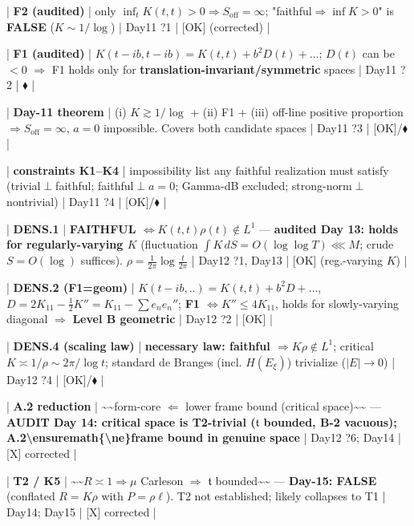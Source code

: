 \documentclass[10pt]{article}
\begin{document}
| \textbf{F2 (audited)} | only $\inf_t K(t,t)>0\Rightarrow S_{\mathrm{off}}=\infty$; "faithful$\Rightarrow\inf K>0$" is \textbf{FALSE} ($K\sim1/\log$) | Day11 ?1 | [OK] (corrected) |\par
| \textbf{F1 (audited)} | $K(t-ib,t-ib)=K(t,t)+b^2D(t)+\dots$; $D(t)$ can be $<0$ \ensuremath{\Rightarrow} F1 holds only for \textbf{translation-invariant/symmetric} spaces | Day11 ?2 | $\blacklozenge$ |\par
| \textbf{Day-11 theorem} | (i) $K\gtrsim1/\log$ + (ii) F1 + (iii) off-line positive proportion $\Rightarrow S_{\mathrm{off}}=\infty$, $a=0$ impossible. Covers both candidate spaces | Day11 ?3 | [OK]/$\blacklozenge$ |\par
| \textbf{constraints K1--K4} | impossibility list any faithful realization must satisfy (trivial$\perp$faithful; faithful$\perp a=0$; Gamma-dB excluded; strong-norm$\perp$nontrivial) | Day11 ?4 | [OK]/$\blacklozenge$ |\par
| \textbf{DENS.1} | \textbf{FAITHFUL $\iff K(t,t)\rho(t)\notin L^1$} --- \textbf{audited Day 13: holds for regularly-varying $K$} (fluctuation $\int K\,dS=O(\log\log T)\lll M$; crude $S=O(\log)$ suffices). $\rho=\tfrac1{2\pi}\log\tfrac t{2\pi}$ | Day12 ?1, Day13 | [OK] (reg.-varying $K$) |\par
| \textbf{DENS.2 (F1=geom)} | $K(t-ib,..)=K(t,t)+b^2D+\dots$, $D=2K_{11}-\tfrac12K''=K_{11}-\sum e_ne_n''$; \textbf{F1 $\iff K''\le4K_{11}$}, holds for slowly-varying diagonal \ensuremath{\Rightarrow} \textbf{Level B geometric} | Day12 ?2 | [OK] |\par
| \textbf{DENS.4 (scaling law)} | \textbf{necessary law: faithful $\Rightarrow K\rho\notin L^1$}; critical $K\asymp1/\rho\sim2\pi/\log t$; standard de Branges (incl. $H(E_\xi)$) trivialize ($|E|\to0$) | Day12 ?4 | [OK]/$\blacklozenge$ |\par
| \textbf{A.2 reduction} | \textasciitilde{}\textasciitilde{}form-core $\Leftarrow$ lower frame bound (critical space)\textasciitilde{}\textasciitilde{} --- \textbf{AUDIT Day 14: critical space is T2-trivial ($\mathfrak t$ bounded, B-2 vacuous); A.2\textbackslash{}ensuremath\{\textbackslash{}ne\}frame bound in genuine space} | Day12 ?6; Day14 | [X] corrected |\par
| \textbf{T2 / K5} | \textasciitilde{}\textasciitilde{}$R\asymp1\Rightarrow\mu$ Carleson \ensuremath{\Rightarrow} $\mathfrak t$ bounded\textasciitilde{}\textasciitilde{} --- \textbf{Day-15: FALSE} (conflated $R=K\rho$ with $P=\rho\ell$). T2 not established; likely collapses to T1 | Day14; Day15 | [X] corrected |\par
\end{document}
